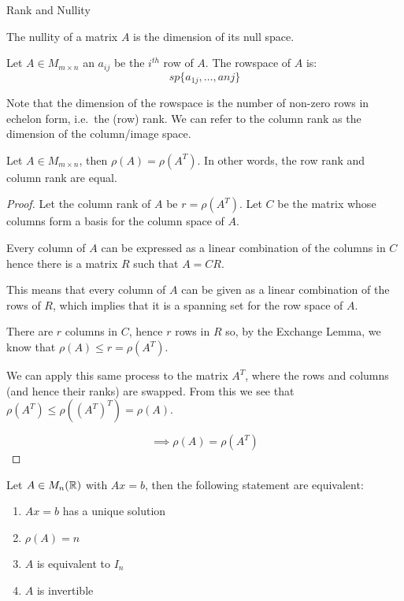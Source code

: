 \documentclass[a4paper,10pt]{article}
\begin{document}
Rank and Nullity

\begin{defn}[Nullity]
	The nullity of a matrix $A$ is the dimension of its null space.
\end{defn}

\begin{defn}[Rowspace]
	Let $A \in M_{m \times n}$ an $a_{ij}$ be the $i^{th}$ row of $A$.
	The rowspace of $A$ is:
	\[
		sp \{ a_{1j}, \ldots, a{nj} \}
	\]
\end{defn}

Note that the dimension of the rowspace is the number of non-zero rows
in echelon form, i.e.\ the (row) rank. We can refer to the column rank as
the dimension of the column/image space.

\begin{thm}
	Let $A \in M_{m \times n}$, then $\rho(A) = \rho(A^T)$. In other
	words, the row rank and column rank are equal.
\end{thm}

\begin{proof}
	Let the column rank of $A$ be $r = \rho(A^T)$. Let $C$ be the
	matrix whose columns form a basis for the column space of $A$.

	Every column of $A$ can be expressed as a linear combination of
	the columns in $C$ hence there is a matrix $R$ such that
	$A = CR$.

	This means that every column of $A$ can be given as a linear
	combination of the rows of $R$, which implies that it is a
	spanning set for the row space of $A$.

	There are $r$ columns in $C$, hence $r$ rows in $R$ so, by the
	Exchange Lemma, we know that $\rho(A) \leq r = \rho(A^T)$.

	We can apply this same process to the matrix $A^T$, where the
	rows and columns (and hence their ranks) are swapped. From this
	we see that $\rho(A^T) \leq \rho({(A^T)}^T) = \rho(A)$.

	\[
		\implies \rho(A) = \rho(A^T)
	\]
\end{proof}

\begin{thm}
	Let $A \in M_n(\mathbb{R})$ with $Ax = b$, then the following statement
	are equivalent:
	\begin{enumerate}
		\item
			$Ax = b$ has a unique solution
		\item
			$\rho(A) = n$
		\item
			$A$ is equivalent to $I_n$
		\item
			$A$ is invertible
	\end{enumerate}
\end{thm}
\end{document}
